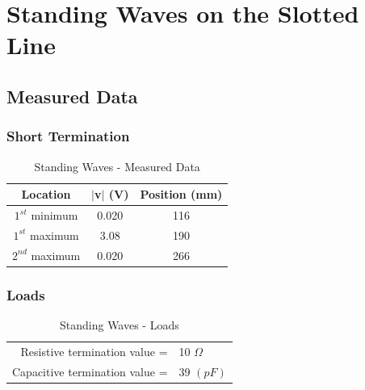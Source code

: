 \documentclass{article}
\begin{document}
\section{Standing Waves on the Slotted Line}
\subsection{Measured Data}
\subsubsection{Short Termination}
\begin{table}[h]
\centering
	\begin{tabular}{|c|c|c|}
	\hline
	\textbf{Location} & $\mid$v$\mid$ (V) & \textbf{Position (mm)} \\ \hline
	$1^{st}$ minimum       & 0.020   & 116                    \\ \hline
	$1^{st}$ maximum       & 3.08    & 190                    \\ \hline
	$2^{nd}$ maximum       & 0.020   & 266                    \\ \hline
	\end{tabular}
	\caption{Standing Waves - Measured Data}
	\label{my-label}
\end{table}

\subsubsection{Loads}

\begin{table}[h]
	\begin{tabular}{rl}
	Resistive termination value =  & 10 $\Omega$ \\
	Capacitive termination value = & 39 $(pF)$      
	\end{tabular}
	\caption{Standing Waves - Loads}
	\label{my-label}
\end{table}
\end{document}
